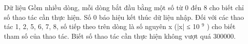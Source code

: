 Dữ liệu
Gồm nhiều dòng, mỗi dòng bắt đầu bằng một số từ 0 đến 8 cho biết chỉ số thao tác cần thực hiện. Số 0 báo hiệu kết thúc dữ liệu nhập. Đối với các thao tác 1, 2, 5, 6, 7, 8, số tiếp theo trên dòng là số nguyên x (|x| ≤ 10   $^    9   $   ) cho biết tham số của thao tác. Biết số thao tác cần thực hiện không vượt quá 300000.